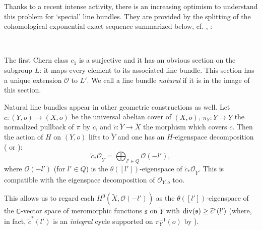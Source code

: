 \documentclass[10pt,a4paper]{amsart}
\numberwithin{equation}{section}
\numberwithin{equation}{subsection}
\theoremstyle{plain}
\theoremstyle{definition}
\begin{document}
Thanks to a recent intense activity, there is an increasing optimism to
understand this problem for  `special' line  bundles.
They  are provided by the splitting of the
cohomological exponential exact sequence
summarized below, cf.  \cite[\S 3]{Line}, \cite[(2.2)]{OkumaRat}:
\begin{center}
\ 
\end{center}
The first Chern class \(c_1\) is a surjective and it has an
obvious section on the subgroup \(L\): it maps every element to its associated
line bundle. This section has a unique extension \(\mathcal{O}\) to
\(L'\). We call a line bundle \emph{natural} if it is in the image
of this section.

Natural line bundles appear in other geometric constructions as
well. Let \(c:(Y,o)\to (X,o)\) be the universal abelian cover of
\((X,o)\), \(\pi_Y:\widetilde{Y}\to Y\) the normalized pullback of
\(\pi\) by \(c\), and
\(\widetilde{c}:\widetilde{Y}\to\widetilde{X}\) the morphism which
covers \(c\). Then the action of \(H\) on \((Y,o)\) lifts to
\(\widetilde{Y}\) and one has an $H$-eigenspace decomposition
(\cite[(3.7)]{Line} or \cite[(3.5)]{Opg}):
\begin{equation}\label{eq:01}
\widetilde{c}_*{\mathcal{O}}_{\widetilde{Y}}=\bigoplus _{l'\in Q}
{\mathcal{O}}(-l'),\end{equation}  where ${\mathcal{O}}(-l')$ (for $l'\in Q$) is the
$\theta([l'])$-eigenspace of $\widetilde{c}_*{\mathcal{O}}_{\widetilde{Y}}$.
This is compatible with the eigenspace decomposition of
${\mathcal{O}}_{Y,o}$ too.

This allows us to regard each $H^0(\widetilde{X},{\mathcal{O}}(-l'))$ as the
$\theta([l'])$-eigenspace of the ${\mathbb{C}}$-vector space of
meromorphic functions ${\mathfrak{s}}$ on $\tilde{Y}$ with ${\rm
div}({\mathfrak{s}})\geq \widetilde{c}^*(l')$ (where, in fact,
$\widetilde{c}^*(l')$ is an {\em integral} cycle supported on
$\pi_Y^{-1}(o)$ by \cite[(3.3)]{Line}).
\end{document}
